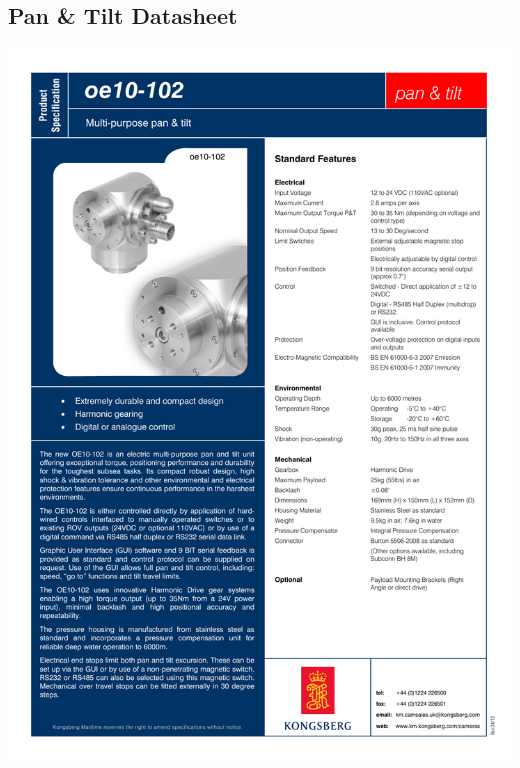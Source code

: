 \begin{appendices}
\subsection{Pan \& Tilt Datasheet}
\includegraphics[width=1\columnwidth]{figs/datasheets/pantilt.pdf}

\end{appendices}
